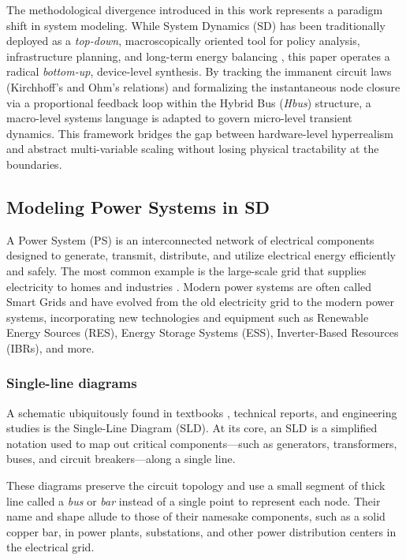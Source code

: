 \documentclass[11pt, a4paper]{article}
\begin{document}
The methodological divergence introduced in this work represents a paradigm shift in system modeling. While System Dynamics (SD) has been traditionally deployed as a \textit{top-down}, macroscopically oriented tool for policy analysis, infrastructure planning, and long-term energy balancing \cite{pr13092969, sys12040109}, this paper operates a radical \textit{bottom-up}, device-level synthesis. By tracking the immanent circuit laws (Kirchhoff's and Ohm's relations) and formalizing the instantaneous node closure via a proportional feedback loop within the Hybrid Bus (\textit{Hbus}) structure, a macro-level systems language is adapted to govern micro-level transient dynamics.  This framework bridges the gap between hardware-level hyperrealism and abstract multi-variable scaling without losing physical tractability at the boundaries.


\subsection{Modeling Power Systems in SD}

A Power System (PS) is an interconnected network of electrical components designed to generate, transmit, distribute, and utilize electrical energy efficiently and safely. The most common example is the large-scale grid that supplies electricity to homes and industries  \cite{Glover2012}. Modern power systems are often called Smart Grids and have evolved from the old electricity grid to the modern power systems, incorporating new technologies and equipment such as Renewable Energy Sources (RES), Energy Storage Systems (ESS), Inverter-Based Resources (IBRs), and more.

\subsubsection{Single-line diagrams} \label{sec:sld}

A schematic ubiquitously found in textbooks \cite{Glover2012}, technical reports, and engineering studies is the Single-Line Diagram (SLD). At its core, an SLD is a simplified notation used to map out critical components—such as generators, transformers, buses, and circuit breakers—along a single line.

These diagrams preserve the circuit topology and use a small segment of thick line called a \textit{bus} or \textit{bar} instead of a single point to represent each node. Their name and shape allude to those of their namesake components, such as a solid copper bar, in power plants, substations, and other power distribution centers in the electrical grid.
\end{document}
